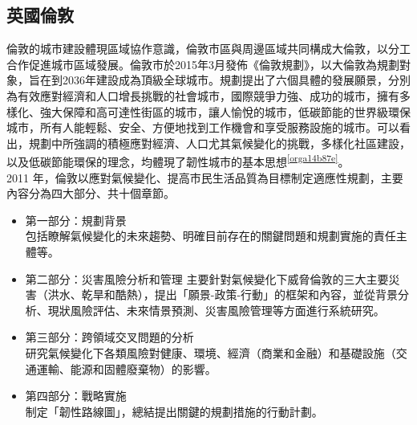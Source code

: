 \documentclass[a4paper,12pt]{article}
\begin{document}
\subsection{英國倫敦}
\label{sec:org1821d0d}
倫敦的城市建設體現區域協作意識，倫敦市區與周邊區域共同構成大倫敦，以分工合作促進城市區域發展。倫敦市於2015年3月發佈《倫敦規劃》，以大倫敦為規劃對象，旨在到2036年建設成為頂級全球城市。規劃提出了六個具體的發展願景，分別為有效應對經濟和人口增長挑戰的社會城市，國際競爭力強、成功的城市，擁有多樣化、強大保障和高可達性街區的城市，讓人愉悅的城市，低碳節能的世界級環保城市，所有人能輕鬆、安全、方便地找到工作機會和享受服務設施的城市。可以看出，規劃中所強調的積極應對經濟、人口尤其氣候變化的挑戰，多樣化社區建設，以及低碳節能環保的理念，均體現了韌性城市的基本思想\textsuperscript{\ref{orga14b87e}}。\\

2011 年，倫敦以應對氣候變化、提高市民生活品質為目標制定適應性規劃，主要內容分為四大部分、共十個章節。\\
\begin{itemize}
\item 第一部分：規劃背景\\
包括瞭解氣候變化的未來趨勢、明確目前存在的關鍵問題和規劃實施的責任主體等。\\
\item 第二部分：災害風險分析和管理  主要針對氣候變化下威脅倫敦的三大主要災害（洪水、乾旱和酷熱），提出「願景-政策-行動」的框架和內容，並從背景分析、現狀風險評估、未來情景預測、災害風險管理等方面進行系統研究。\\
\item 第三部分：跨領域交叉問題的分析\\
研究氣候變化下各類風險對健康、環境、經濟（商業和金融）和基礎設施（交通運輸、能源和固體廢棄物）的影響。\\
\item 第四部分：戰略實施\\
制定「韌性路線圖」，總結提出關鍵的規劃措施的行動計劃。\\
\end{itemize}
\end{document}

